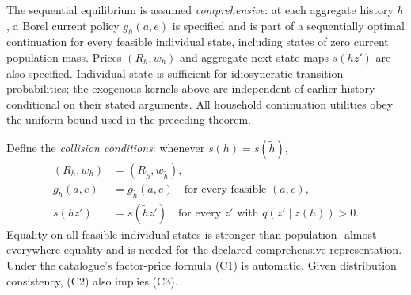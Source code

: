 \documentclass[11pt]{article}
\theoremstyle{remark}
\begin{document}
The sequential equilibrium is assumed \emph{comprehensive}: at each
aggregate history $h$, a Borel current policy $g_h(a,e)$ is specified
and is part of a sequentially optimal continuation for every feasible
individual state, including states of zero current population mass.
Prices $(R_h,w_h)$ and aggregate next-state maps $s(hz')$ are also
specified. Individual state is sufficient for idiosyncratic transition
probabilities; the exogenous kernels above are independent of earlier
history conditional on their stated arguments. All household continuation
utilities obey the uniform bound used in the preceding theorem.

Define the \emph{collision conditions}: whenever $s(h)=s(\widetilde h)$,
\begin{align}
 (R_h,w_h)&=(R_{\widetilde h},w_{\widetilde h}), \tag{C1}\\
 g_h(a,e)&=g_{\widetilde h}(a,e)
       \quad\text{for every feasible }(a,e), \tag{C2}\\
 s(hz')&=s(\widetilde h z')
       \quad\text{for every }z'\text{ with }q(z'\mid z(h))>0. \tag{C3}
\end{align}
Equality on all feasible individual states is stronger than population-
almost-everywhere equality and is needed for the declared comprehensive
representation. Under the catalogue's factor-price formula (C1) is
automatic. Given distribution consistency, (C2) also implies (C3).
\end{document}
